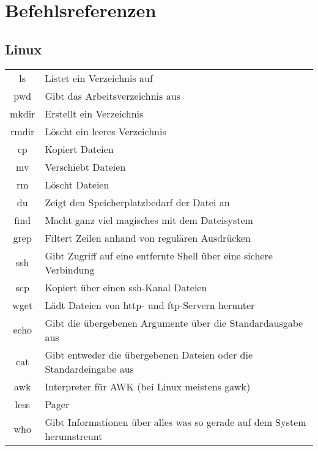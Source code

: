 \section{Befehlsreferenzen}
\subsection{Linux}
\begin{tabular}[h!]{cl}
  ls     & Listet ein Verzeichnis auf \\
  pwd    & Gibt das Arbeitsverzeichnis aus \\
  mkdir  & Erstellt ein Verzeichnis \\
  rmdir  & Löscht ein leeres Verzeichnis \\
  cp     & Kopiert Dateien \\
  mv     & Verschiebt Dateien \\
  rm     & Löscht Dateien \\
  du     & Zeigt den Speicherplatzbedarf der Datei an \\
  find   & Macht ganz viel magisches mit dem Dateisystem \\
  grep   & Filtert Zeilen anhand von regulären Ausdrücken \\
  ssh    & Gibt Zugriff auf eine entfernte Shell über eine sichere Verbindung \\
  scp    & Kopiert über einen ssh-Kanal Dateien \\
  wget   & Lädt Dateien von http- und ftp-Servern herunter \\
  echo   & Gibt die übergebenen Argumente über die Standardausgabe aus \\
  cat    & Gibt entweder die übergebenen Dateien oder die Standardeingabe aus \\
  awk    & Interpreter für AWK (bei Linux meistens gawk) \\
  less   & Pager \\
  who    & Gibt Informationen über alles was so gerade auf dem System
           herumstreunt
\end{tabular}

